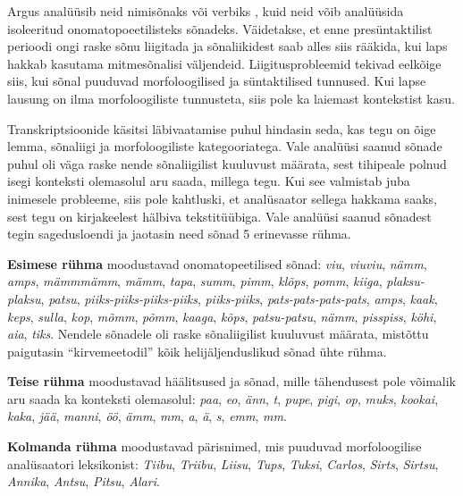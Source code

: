 \documentclass[12pt]{article}
\begin{document}
Argus analüüsib neid nimisõnaks või verbiks \citep[28]{IMITATIIV}, kuid neid võib analüüsida isoleeritud onomatopoeetilisteks sõnadeks. Väidetakse, et enne presüntaktilist perioodi ongi raske sõnu liigitada ja sõnaliikidest saab alles siis rääkida, kui laps hakkab kasutama mitmesõnalisi väljendeid. Liigitusprobleemid tekivad eelkõige siis, kui sõnal puuduvad morfoloogilised ja süntaktilised tunnused. Kui lapse lausung on ilma morfoloogiliste tunnusteta, siis pole ka laiemast kontekstist kasu. \citep[27--29]{IMITATIIV}

Transkriptsioonide käsitsi läbivaatamise puhul hindasin seda, kas tegu on õige lemma, sõnaliigi ja morfoloogiliste kategooriatega. Vale analüüsi saanud sõnade puhul oli väga raske nende sõnaliigilist kuuluvust määrata, sest tihipeale polnud isegi konteksti olemasolul aru saada, millega tegu. Kui see valmistab juba inimesele probleeme, siis pole kahtluski, et analüsaator sellega hakkama saaks, sest tegu on kirjakeelest hälbiva tekstitüübiga. Vale analüüsi saanud sõnadest tegin sagedusloendi ja jaotasin need sõnad 5 erinevasse rühma.

\textbf{Esimese rühma} moodustavad onomatopeetilised sõnad: \emph{viu}, \emph{viuviu}, \emph{nämm}, \emph{amps}, \emph{mämmmämm}, \emph{mämm}, \emph{tapa}, \emph{summ}, \emph{pimm}, \emph{klõps}, \emph{pomm}, \emph{kiiga}, \emph{plaksu-plaksu}, \emph{patsu}, \emph{piiks-piiks-piiks-piiks}, \emph{piiks-piiks}, \emph{pats-pats-pats-pats}, \emph{amps}, \emph{kaak}, \emph{keps}, \emph{sulla}, \emph{kop}, \emph{mõmm}, \emph{põmm}, \emph{kaaga}, \emph{kõps}, \emph{patsu-patsu}, \emph{nämm}, \emph{pisspiss}, \emph{köhi}, \emph{aia}, \emph{tiks}. Nendele sõnadele oli raske sõnaliigilist kuuluvust määrata, mistõttu paigutasin ``kirvemeetodil'' kõik helijäljenduslikud sõnad ühte rühma.


\textbf{Teise rühma} moodustavad häälitsused ja sõnad, mille tähendusest pole võimalik aru saada ka konteksti olemasolul: \emph{paa}, \emph{eo}, \emph{änn}, \emph{t}, \emph{pupe}, \emph{pigi}, \emph{op}, \emph{muks}, \emph{kookai}, \emph{kaka}, \emph{jää}, \emph{manni}, \emph{öö}, \emph{ämm}, \emph{mm}, \emph{a}, \emph{ä}, \emph{s}, \emph{emm}, \emph{mm}.

\textbf{Kolmanda rühma} moodustavad pärisnimed, mis puuduvad morfoloogilise analüsaatori leksikonist: \emph{Tiibu}, \emph{Triibu}, \emph{Liisu}, \emph{Tups}, \emph{Tuksi}, \emph{Carlos}, \emph{Sirts}, \emph{Sirtsu}, \emph{Annika}, \emph{Antsu}, \emph{Pitsu}, \emph{Alari}.
\end{document}
